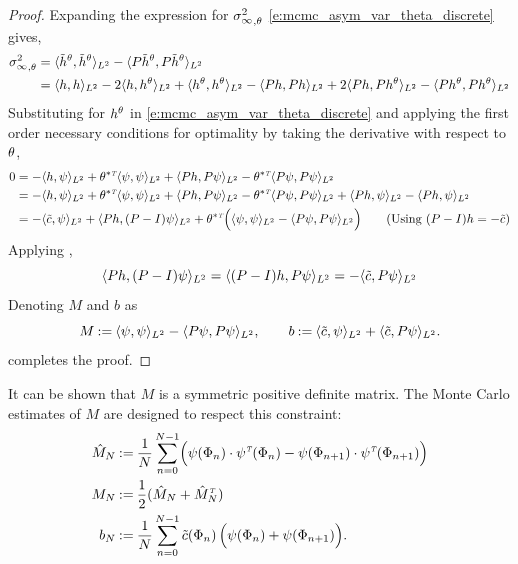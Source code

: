 \begin{proof}
	Expanding the expression for ${\sigma^2_\infty}_{,\theta}$ \eqref{e:mcmc_asym_var_theta_discrete} gives,
	\begin{equation}
	\begin{aligned}
	{\asymvar}_{,\param} & = \langle \tilh^\param, \tilh^\param \rangle_{L^2} - \langle P \tilh^\param, P \tilh^\param \rangle_{L^2} \\
	& = \langle h, h \rangle_{L^2} - 2 \langle h, h^\param \rangle_{L^2} + \langle h^\param , h^\param \rangle_{L^2} - \langle P h, P h \rangle_{L^2} + 2 \langle P h , P h^\param \rangle_{L^2} - \langle P h ^\param , P h^\param \rangle_{L^2}
	\label{e:gamma_discrete}
	\end{aligned}
	\end{equation}
	Substituting for $h^\theta$ in \eqref{e:mcmc_asym_var_theta_discrete} and applying the first order necessary conditions for optimality by taking the derivative with respect to $\theta$,
	\begin{equation}
	\begin{aligned}
	0 & = - \langle h, \psi \rangle_{L^2} +  \param^{*\transpose} \langle \psi, \psi \rangle_{L^2}+ \langle P h, P \psi \rangle_{L^2}-\param^{*\transpose}  \langle P \psi, P  \psi \rangle_{L^2}  \\
	& = - \langle h, \psi \rangle_{L^2} +  \param^{*\transpose} \langle \psi, \psi \rangle_{L^2}+ \langle P h, P \psi \rangle_{L^2}-\param^{*\transpose}  \langle P \psi, P  \psi \rangle_{L^2}  + \langle P h, \psi \rangle_{L^2} - \langle P h, \psi \rangle_{L^2} \\
	& = - \langle \tilc , \psi \rangle_{L^2} + \langle P h, (P - I) \psi \rangle_{L^2} + \param^{*\transpose} \Bigl( \langle \psi, \psi \rangle_{L^2}  - \langle P \psi, P \psi \rangle_{L^2} \Bigr) \qquad \text{(Using $(P-I) h = -\tilc$)}
	\label{e:mcmc_gradient_reversible}
	\end{aligned}
	\end{equation}
	Applying ,
	\[
	\langle P h , (P -I) \psi \rangle_{L^2} = \langle (P - I) h, P \psi\rangle_{L^2} = - \langle \tilde c, P \psi \rangle_{L^2}
	\]
	Denoting $M$ and $b$ as
	\[
	M \mathbin{:=} \langle \psi, \psi \rangle_{L^2} - \langle P \psi, P \psi \rangle_{L^2}, \qquad b \mathbin{:=} \langle \tilde c, \psi \rangle_{L^2} + \langle \tilde c, P \psi \rangle_{L^2}.
	\]
	completes the proof.
\end{proof}
It can be shown that $M$ is a symmetric positive definite matrix. The Monte Carlo estimates of $M$ are designed to respect this constraint:
\[
\begin{aligned}
\hat{M}_N & \mathbin{:=} \frac{1}{N} \sum_{n=0}^{N-1} \Bigl(\psi(\Phi_n) \cdot\psi^{\hbox{\tiny\it T}}(\Phi_n) - \psi(\Phi_{n+1})\cdot \psi^{\hbox{\tiny\it T}}(\Phi_{n+1}) \Bigr) \\
M_N  & \mathbin{:=} \frac{1}{2} (\hat{M}_N + \hat{M}_N^{\hbox{\tiny\it T}} )\\
b_N & \mathbin{:=}  \frac{1}{N} \sum_{n=0}^{N-1} \tilde c(\Phi_n)\, \Bigl( \psi(\Phi_n) + \psi(\Phi_{n+1}) \Bigr).
\end{aligned}
\]

